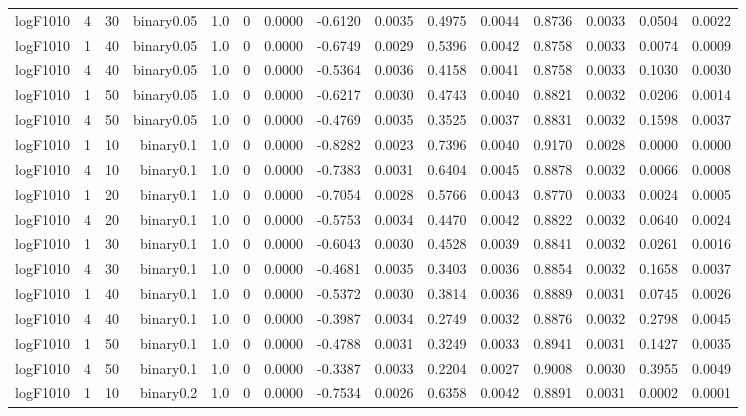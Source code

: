 \begin{longtable}{rrrrrrrrrrrrrrr}
  logF1010 & 4 & 30 & binary0.05 & 1.0 & 0 & 0.0000 & -0.6120 & 0.0035 & 0.4975 & 0.0044 & 0.8736 & 0.0033 & 0.0504 & 0.0022 \\ 
  logF1010 & 1 & 40 & binary0.05 & 1.0 & 0 & 0.0000 & -0.6749 & 0.0029 & 0.5396 & 0.0042 & 0.8758 & 0.0033 & 0.0074 & 0.0009 \\ 
  logF1010 & 4 & 40 & binary0.05 & 1.0 & 0 & 0.0000 & -0.5364 & 0.0036 & 0.4158 & 0.0041 & 0.8758 & 0.0033 & 0.1030 & 0.0030 \\ 
  logF1010 & 1 & 50 & binary0.05 & 1.0 & 0 & 0.0000 & -0.6217 & 0.0030 & 0.4743 & 0.0040 & 0.8821 & 0.0032 & 0.0206 & 0.0014 \\ 
  logF1010 & 4 & 50 & binary0.05 & 1.0 & 0 & 0.0000 & -0.4769 & 0.0035 & 0.3525 & 0.0037 & 0.8831 & 0.0032 & 0.1598 & 0.0037 \\ 
  logF1010 & 1 & 10 & binary0.1 & 1.0 & 0 & 0.0000 & -0.8282 & 0.0023 & 0.7396 & 0.0040 & 0.9170 & 0.0028 & 0.0000 & 0.0000 \\ 
  logF1010 & 4 & 10 & binary0.1 & 1.0 & 0 & 0.0000 & -0.7383 & 0.0031 & 0.6404 & 0.0045 & 0.8878 & 0.0032 & 0.0066 & 0.0008 \\ 
  logF1010 & 1 & 20 & binary0.1 & 1.0 & 0 & 0.0000 & -0.7054 & 0.0028 & 0.5766 & 0.0043 & 0.8770 & 0.0033 & 0.0024 & 0.0005 \\ 
  logF1010 & 4 & 20 & binary0.1 & 1.0 & 0 & 0.0000 & -0.5753 & 0.0034 & 0.4470 & 0.0042 & 0.8822 & 0.0032 & 0.0640 & 0.0024 \\ 
  logF1010 & 1 & 30 & binary0.1 & 1.0 & 0 & 0.0000 & -0.6043 & 0.0030 & 0.4528 & 0.0039 & 0.8841 & 0.0032 & 0.0261 & 0.0016 \\ 
  logF1010 & 4 & 30 & binary0.1 & 1.0 & 0 & 0.0000 & -0.4681 & 0.0035 & 0.3403 & 0.0036 & 0.8854 & 0.0032 & 0.1658 & 0.0037 \\ 
  logF1010 & 1 & 40 & binary0.1 & 1.0 & 0 & 0.0000 & -0.5372 & 0.0030 & 0.3814 & 0.0036 & 0.8889 & 0.0031 & 0.0745 & 0.0026 \\ 
  logF1010 & 4 & 40 & binary0.1 & 1.0 & 0 & 0.0000 & -0.3987 & 0.0034 & 0.2749 & 0.0032 & 0.8876 & 0.0032 & 0.2798 & 0.0045 \\ 
  logF1010 & 1 & 50 & binary0.1 & 1.0 & 0 & 0.0000 & -0.4788 & 0.0031 & 0.3249 & 0.0033 & 0.8941 & 0.0031 & 0.1427 & 0.0035 \\ 
  logF1010 & 4 & 50 & binary0.1 & 1.0 & 0 & 0.0000 & -0.3387 & 0.0033 & 0.2204 & 0.0027 & 0.9008 & 0.0030 & 0.3955 & 0.0049 \\ 
  logF1010 & 1 & 10 & binary0.2 & 1.0 & 0 & 0.0000 & -0.7534 & 0.0026 & 0.6358 & 0.0042 & 0.8891 & 0.0031 & 0.0002 & 0.0001 \\ 

\end{longtable}
